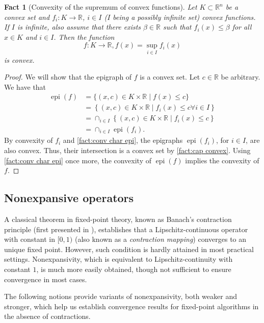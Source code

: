 \documentclass[smallextended,numbook,nospthms]{svjour3}
\theoremstyle{plain}
\newtheorem{fact}[theorem]{Fact}
\theoremstyle{definition}
\def\RR{\mathds R}
\DeclareMathOperator{\epi}{epi}
\begin{document}
\begin{fact}[Convexity of the supremum of convex functions]\label{fact:convex sup}
	Let $K \subset \RR^n$ be a convex set and $f_i: K \rightarrow \RR$, $i \in I$ ($I$ being a possibly infinite set) convex functions. If $I$ is infinite, also assume that there exists $\beta \in \RR$ such that $f_i(x) \leq \beta$ for all $x \in K$ and $i \in I$.
	Then the function
	\[
	f:K \rightarrow \RR, f(x)=\sup_{i \in I}f_{i}(x)
	\]
	is convex.
\end{fact}
\begin{proof}
	We will show that the epigraph of $f$ is a convex set. Let $c \in \RR$ be arbitrary. We have that
	\begin{align}
		\epi(f) &=\{(x, c) \in K \times \RR \mid f(x) \leq c\} \\
		&=\left\{(x, c) \in K \times \RR \mid f_{i}(x) \leq c \forall i \in I\right\} \\
		&=\cap_{i \in I}\left\{(x, c) \in K \times \RR \mid f_{i}(x) \leq c\right\} \\
		&=\cap_{i \in I} \epi(f_{i}).
	\end{align}
	By convexity of $f_{i}$ and \cref{fact:conv char epi}, the epigraphs $\epi(f_{i})$, for $i \in I$, are also convex. Thus, their intersection is a convex set by \cref{fact:cap convex}. Using \cref{fact:conv char epi} once more, the convexity of $\epi(f)$ implies the convexity of $f$.
\end{proof}

\subsection{Nonexpansive operators}\label{subseq:nonexp}

A classical theorem in fixed-point theory, known as Banach's contraction principle (first presented in \cite{Banach:1922}), establishes that a Lipschitz-continuous operator with constant in $[0,1)$ (also known as a \emph{contraction mapping}) converges to an unique fixed point. However, such condition is hardly attained in most practical settings. Nonexpansivity, which is equivalent to Lipschitz-continuity with constant $1$, is much more easily obtained, though not sufficient to ensure convergence in most cases.

The following notions provide variants of nonexpansivity, both weaker and stronger, which help us establish convergence results for fixed-point algorithms in the absence of contractions.
\end{document}
